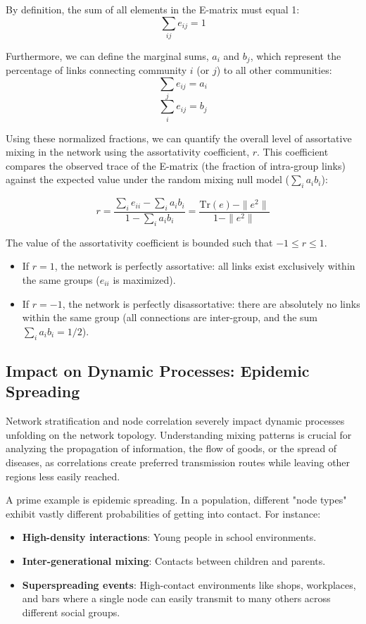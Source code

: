 By definition, the sum of all elements in the E-matrix must equal 1:
$$\sum_{ij} e_{ij} = 1$$

Furthermore, we can define the marginal sums, $a_i$ and $b_j$, which represent the percentage of links connecting community $i$ (or $j$) to all other communities:
$$\sum_{j} e_{ij} = a_i$$
$$\sum_{i} e_{ij} = b_j$$

Using these normalized fractions, we can quantify the overall level of assortative mixing in the network using the assortativity coefficient, $r$. This coefficient compares the observed trace of the E-matrix (the fraction of intra-group links) against the expected value under the random mixing null model ($\sum_{i} a_i b_i$):

$$r = \frac{\sum_{i} e_{ii} - \sum_{i} a_i b_i}{1 - \sum_{i} a_i b_i} = \frac{\mathrm{Tr}(e) - \|e^2\|}{1 - \|e^2\|}$$

The value of the assortativity coefficient is bounded such that $-1 \le r \le 1$.
\begin{itemize}
    \item If $r = 1$, the network is perfectly assortative: all links exist exclusively within the same groups ($e_{ii}$ is maximized).
    \item If $r = -1$, the network is perfectly disassortative: there are absolutely no links within the same group (all connections are inter-group, and the sum $\sum_i a_i b_i = 1/2$).
\end{itemize}

\subsection{Impact on Dynamic Processes: Epidemic Spreading}
\label{subsec:epidemic_spreading}

Network stratification and node correlation severely impact dynamic processes unfolding on the network topology. Understanding mixing patterns is crucial for analyzing the propagation of information, the flow of goods, or the spread of diseases, as correlations create preferred transmission routes while leaving other regions less easily reached.

A prime example is epidemic spreading. In a population, different "node types" exhibit vastly different probabilities of getting into contact. For instance:
\begin{itemize}
    \item \textbf{High-density interactions}: Young people in school environments.
    \item \textbf{Inter-generational mixing}: Contacts between children and parents.
    \item \textbf{Superspreading events}: High-contact environments like shops, workplaces, and bars where a single node can easily transmit to many others across different social groups.
\end{itemize}

